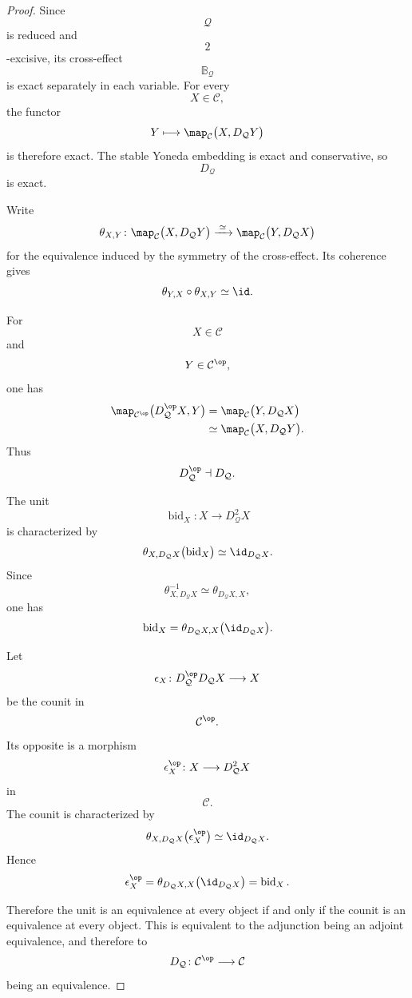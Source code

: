 \begin{proof}
Since
\[
    \mathcal Q
\]
is reduced and
\[
    2
\]
-excisive, its cross-effect
\[
    \mathbb B_{\mathcal Q}
\]
is exact separately in each variable. For every
\[
    X\in\mathcal C,
\]
the functor
\[
    Y
    \longmapsto
    \map_{\mathcal C}
    \bigl(
        X,
        D_{\mathcal Q}Y
    \bigr)
\]
is therefore exact. The stable Yoneda embedding is exact and conservative,
so
\[
    D_{\mathcal Q}
\]
is exact.

Write
\[
    \theta_{X,Y}
    \colon
    \map_{\mathcal C}
    \bigl(
        X,
        D_{\mathcal Q}Y
    \bigr)
    \xrightarrow{\;\simeq\;}
    \map_{\mathcal C}
    \bigl(
        Y,
        D_{\mathcal Q}X
    \bigr)
\]
for the equivalence induced by the symmetry of the cross-effect. Its
coherence gives
\[
    \theta_{Y,X}
    \circ
    \theta_{X,Y}
    \simeq
    \id.
\]

For
\[
    X\in\mathcal C
\]
and
\[
    Y\in\mathcal C^{\op},
\]
one has
\[
\begin{aligned}
    \map_{\mathcal C^{\op}}
    \bigl(
        D_{\mathcal Q}^{\op}X,
        Y
    \bigr)
    &=
    \map_{\mathcal C}
    \bigl(
        Y,
        D_{\mathcal Q}X
    \bigr)
    \\
    &\simeq
    \map_{\mathcal C}
    \bigl(
        X,
        D_{\mathcal Q}Y
    \bigr).
\end{aligned}
\]
Thus
\[
    D_{\mathcal Q}^{\op}
    \dashv
    D_{\mathcal Q}.
\]

The unit
\[
    \operatorname{bid}_X
    \colon
    X
    \longrightarrow
    D_{\mathcal Q}^2X
\]
is characterized by
\[
    \theta_{X,D_{\mathcal Q}X}
    \bigl(
        \operatorname{bid}_X
    \bigr)
    \simeq
    \id_{D_{\mathcal Q}X}.
\]
Since
\[
    \theta_{X,D_{\mathcal Q}X}^{-1}
    \simeq
    \theta_{D_{\mathcal Q}X,X},
\]
one has
\[
    \operatorname{bid}_X
    =
    \theta_{D_{\mathcal Q}X,X}
    \bigl(
        \id_{D_{\mathcal Q}X}
    \bigr).
\]

Let
\[
    \epsilon_X
    \colon
    D_{\mathcal Q}^{\op}D_{\mathcal Q}X
    \longrightarrow
    X
\]
be the counit in
\[
    \mathcal C^{\op}.
\]
Its opposite is a morphism
\[
    \epsilon_X^{\op}
    \colon
    X
    \longrightarrow
    D_{\mathcal Q}^2X
\]
in
\[
    \mathcal C.
\]
The counit is characterized by
\[
    \theta_{X,D_{\mathcal Q}X}
    \bigl(
        \epsilon_X^{\op}
    \bigr)
    \simeq
    \id_{D_{\mathcal Q}X}.
\]
Hence
\[
    \epsilon_X^{\op}
    =
    \theta_{D_{\mathcal Q}X,X}
    \bigl(
        \id_{D_{\mathcal Q}X}
    \bigr)
    =
    \operatorname{bid}_X.
\]

Therefore the unit is an equivalence at every object if and only if the
counit is an equivalence at every object. This is equivalent to the
adjunction being an adjoint equivalence, and therefore to
\[
    D_{\mathcal Q}
    \colon
    \mathcal C^{\op}
    \longrightarrow
    \mathcal C
\]
being an equivalence.
\end{proof}


